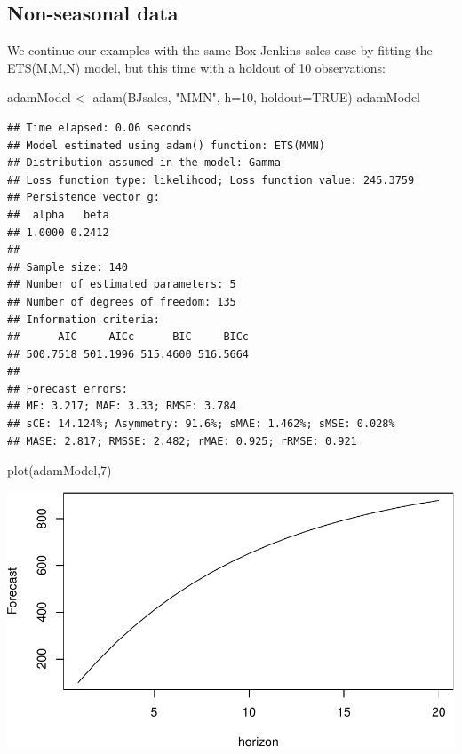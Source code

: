 \documentclass[
]{book}
\newenvironment{Shaded}{\begin{snugshade}}{\end{snugshade}}
\newcommand{\AttributeTok}[1]{\textcolor[rgb]{0.77,0.63,0.00}{#1}}
\newcommand{\ConstantTok}[1]{\textcolor[rgb]{0.00,0.00,0.00}{#1}}
\newcommand{\DecValTok}[1]{\textcolor[rgb]{0.00,0.00,0.81}{#1}}
\newcommand{\FunctionTok}[1]{\textcolor[rgb]{0.00,0.00,0.00}{#1}}
\newcommand{\NormalTok}[1]{#1}
\newcommand{\OtherTok}[1]{\textcolor[rgb]{0.56,0.35,0.01}{#1}}
\newcommand{\StringTok}[1]{\textcolor[rgb]{0.31,0.60,0.02}{#1}}
\theoremstyle{definition}
\theoremstyle{definition}
\theoremstyle{definition}
\theoremstyle{definition}
\theoremstyle{remark}
\begin{document}
\hypertarget{non-seasonal-data-1}{%
\subsection{Non-seasonal data}\label{non-seasonal-data-1}}

We continue our examples with the same Box-Jenkins sales case by fitting the ETS(M,M,N) model, but this time with a holdout of 10 observations:

\begin{Shaded}
\begin{Highlighting}[]
\NormalTok{adamModel }\OtherTok{\textless{}{-}} \FunctionTok{adam}\NormalTok{(BJsales, }\StringTok{"MMN"}\NormalTok{, }\AttributeTok{h=}\DecValTok{10}\NormalTok{, }\AttributeTok{holdout=}\ConstantTok{TRUE}\NormalTok{)}
\NormalTok{adamModel}
\end{Highlighting}
\end{Shaded}

\begin{verbatim}
## Time elapsed: 0.06 seconds
## Model estimated using adam() function: ETS(MMN)
## Distribution assumed in the model: Gamma
## Loss function type: likelihood; Loss function value: 245.3759
## Persistence vector g:
##  alpha   beta 
## 1.0000 0.2412 
## 
## Sample size: 140
## Number of estimated parameters: 5
## Number of degrees of freedom: 135
## Information criteria:
##      AIC     AICc      BIC     BICc 
## 500.7518 501.1996 515.4600 516.5664 
## 
## Forecast errors:
## ME: 3.217; MAE: 3.33; RMSE: 3.784
## sCE: 14.124%; Asymmetry: 91.6%; sMAE: 1.462%; sMSE: 0.028%
## MASE: 2.817; RMSSE: 2.482; rMAE: 0.925; rRMSE: 0.921
\end{verbatim}

\begin{Shaded}
\begin{Highlighting}[]
\FunctionTok{plot}\NormalTok{(adamModel,}\DecValTok{7}\NormalTok{)}
\end{Highlighting}
\end{Shaded}

\includegraphics{adam_files/figure-latex/unnamed-chunk-41-1.pdf}
\end{document}
